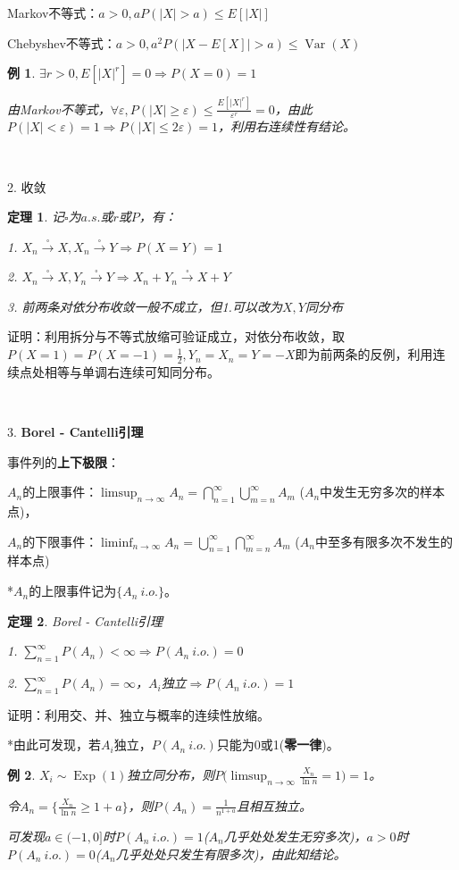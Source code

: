 \documentclass[a4paper,UTF8,fontset=windows]{ctexart}
\newtheorem{thm}{定理}[section]
\newtheorem{exmp}{例}[section]
\DeclareMathOperator{\Exp}{Exp}
\DeclareMathOperator{\Var}{Var}
\newcommand{\con}[1]{\stackrel{#1}{\longrightarrow}}
\begin{document}
Markov不等式：$a>0,aP(|X|>a)\le E[|X|]$

Chebyshev不等式：$a>0,a^2P(|X-E[X]|>a)\le\Var(X)$

\begin{exmp} $\exists r>0,E[|X|^r]=0\Rightarrow P(X=0)=1$

由Markov不等式，$\forall\varepsilon,P(|X|\ge\varepsilon)\le\frac{E[|X|^r]}{\varepsilon^r}=0$，由此$P(|X|<\varepsilon)=1\Rightarrow P(|X|\le2\varepsilon)=1$，利用右连续性有结论。
\end{exmp}

~

2. 收敛

\begin{thm}
记$\square$为$a.s.$或$r$或$P$，有：

1. $X_n\con{\square}X,X_n\con{\square}Y\Rightarrow P(X=Y)=1$

2. $X_n\con{\square}X,Y_n\con{\square}Y\Rightarrow X_n+Y_n\con{\square}X+Y$

3. 前两条对依分布收敛一般不成立，但1.可以改为$X,Y$同分布
\end{thm}

证明：利用拆分与不等式放缩可验证成立，对依分布收敛，取$P(X=1)=P(X=-1)=\frac{1}{2},Y_n=X_n=Y=-X$即为前两条的反例，利用连续点处相等与单调右连续可知同分布。

~

3. \textbf{Borel - Cantelli引理}

事件列的\textbf{上下极限}：

$A_n$的上限事件：$\limsup_{n\to\infty}A_n=\bigcap_{n=1}^\infty\bigcup_{m=n}^\infty A_m$ ($A_n$中发生无穷多次的样本点)，

$A_n$的下限事件：$\liminf_{n\to\infty}A_n=\bigcup_{n=1}^\infty\bigcap_{m=n}^\infty A_m$ ($A_n$中至多有限多次不发生的样本点)

*$A_n$的上限事件记为$\{A_n\ i.o.\}$。

\begin{thm} Borel - Cantelli引理

1. $\sum_{n=1}^\infty P(A_n)<\infty\Rightarrow P(A_n\ i.o.)=0$

2. $\sum_{n=1}^\infty P(A_n)=\infty$，$A_i$独立$\Rightarrow P(A_n\ i.o.)=1$
\end{thm}

证明：利用交、并、独立与概率的连续性放缩。

*由此可发现，若$A_i$独立，$P(A_n\ i.o.)$只能为0或1(\textbf{零一律})。

\begin{exmp} $X_i\sim\Exp(1)$独立同分布，则$P\bigg(\limsup_{n\to\infty}\frac{X_n}{\ln{n}}=1\bigg)=1$。

令$A_n=\bigg\{\frac{X_n}{\ln{n}}\ge 1+a\bigg\}$，则$P(A_n)=\frac{1}{n^{1+a}}$且相互独立。

可发现$a\in(-1,0]$时$P(A_n\ i.o.)=1$($A_n$几乎处处发生无穷多次)，$a>0$时$P(A_n\ i.o.)=0$($A_n$几乎处处只发生有限多次)，由此知结论。
\end{exmp}
\end{document}
